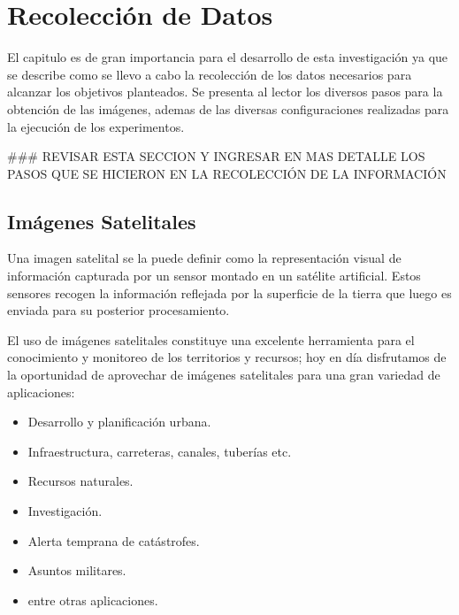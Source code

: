 \chapter{Recolección de Datos}\label{chap:recoleccion}

El capitulo es de gran importancia para el desarrollo de esta investigación ya que se describe como se llevo a cabo la recolección de los datos necesarios para alcanzar los objetivos planteados. Se presenta al lector los diversos pasos para la obtención de las imágenes, ademas de las diversas configuraciones realizadas para la ejecución de los experimentos.


### REVISAR ESTA SECCION Y INGRESAR EN MAS DETALLE LOS PASOS QUE SE HICIERON EN LA RECOLECCIÓN DE LA INFORMACIÓN


\section{Imágenes Satelitales}\label{sec:imagen_satelitales}

Una imagen satelital se la puede definir como la representación visual de información capturada por un sensor montado en un satélite artificial. Estos sensores recogen la información reflejada por la superficie de la tierra que luego es enviada para su posterior procesamiento.

El uso de imágenes satelitales constituye una excelente herramienta para el conocimiento y monitoreo de los territorios y recursos; hoy en día disfrutamos de la oportunidad de aprovechar de imágenes satelitales para una gran variedad de aplicaciones:
\begin{itemize}
	\item Desarrollo y planificación urbana.
	\item Infraestructura, carreteras, canales, tuberías etc.
	\item Recursos naturales.
	\item Investigación.
	\item Alerta temprana de catástrofes.
	\item Asuntos militares.
	\item entre otras aplicaciones.
\end{itemize}

